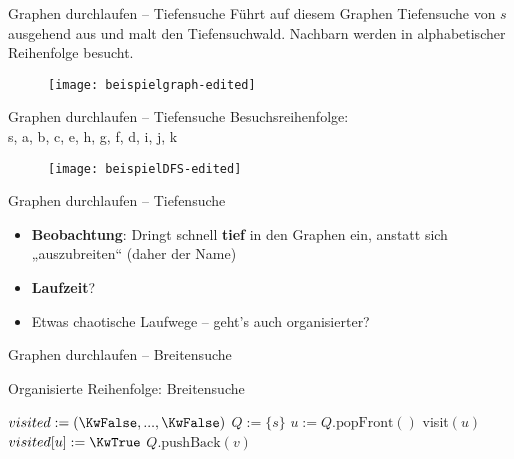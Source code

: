 \begin{frame}{Graphen durchlaufen – Tiefensuche}
	Führt auf diesem Graphen Tiefensuche von $s$ ausgehend aus und malt den Tiefensuchwald. Nachbarn werden in alphabetischer Reihenfolge besucht.
	\vspace{-\baselineskip}
	\begin{figure}[htp]
		\centering
		\texttt{[image: beispielgraph-edited]}
	\end{figure}
\end{frame}

\begin{frame}{Graphen durchlaufen – Tiefensuche}
	\solutionheading
	Besuchsreihenfolge: \\ s, a, b, c, e, h, g, f, d, i, j, k
	\begin{figure}[htp]
		\centering
		\texttt{[image: beispielDFS-edited]}
	\end{figure}
\end{frame}

\begin{frame}{Graphen durchlaufen – Tiefensuche}
	\begin{itemize}
		\item<+-> \textbf{Beobachtung}: Dringt schnell \textbf{tief} in den Graphen ein, anstatt sich „auszubreiten“ (daher der Name)
		\item<+-> \textbf{Laufzeit}? \visible<+->{$\Theta(n+m)$} \\ 
		\item<+-> Etwas chaotische Laufwege -- geht's auch organisierter?
	\end{itemize}
\end{frame}

\begin{frame}{Graphen durchlaufen – Breitensuche}
	\begin{exampleblock}{Organisierte Reihenfolge: Breitensuche}
		\begin{algorithm}[H]
			 {
				$visited := (\KwFalse, ... , \KwFalse)$\;
				$Q := \{s\}$ \;
				 {
					$u := Q.\text{popFront}()$\;
					 {
						visit$(u)$  \;
						$visited[u] := \KwTrue$\;
						 {
							$Q.\text{pushBack}(v)$\;
						}
					}
				}
			}
		\end{algorithm}
	\end{exampleblock}
\end{frame}

